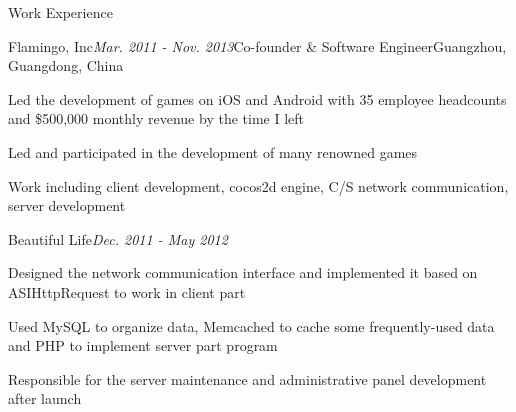 \documentclass{resume} %
\begin{document}
\begin{rSection}{Work Experience}

\begin{rSubsection}{Flamingo, Inc}{\em Mar. 2011 - Nov. 2013}{Co-founder \& Software Engineer}{Guangzhou, Guangdong, China}
\item Led the development of games on iOS and Android with 35 employee headcounts and \$500,000 monthly revenue by the time I left
\item Led and participated in the development of many renowned games
\item Work including client development, cocos2d engine, C/S network communication, server development
\end{rSubsection}


\begin{rSubsection}{Beautiful Life}{\em Dec. 2011 - May 2012}{}{}
\item Designed the network communication interface and implemented it based on ASIHttpRequest to work in client part
\item Used MySQL to organize data, Memcached to cache some frequently-used data and PHP to implement server part program
\item Responsible for the server maintenance and administrative panel development after launch
\end{rSubsection}


\end{rSection}










\end{document}
